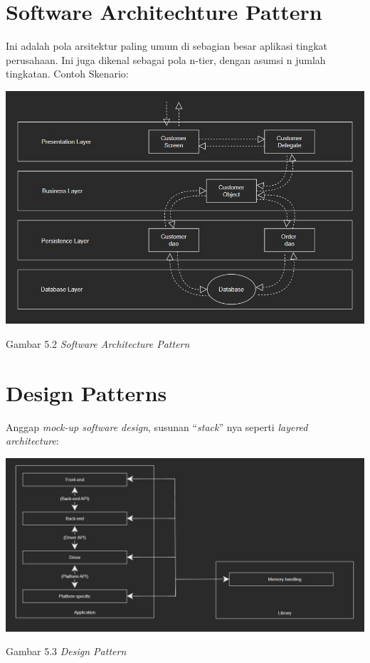 \section{Software Architechture Pattern}
Ini adalah pola arsitektur paling umum di sebagian besar aplikasi tingkat perusahaan. Ini juga dikenal sebagai pola n-tier, dengan asumsi n jumlah tingkatan. Contoh Skenario:

\includegraphics[width=\textwidth]{../images/Software Architecture Pattern}
\begin{center}
	Gambar 5.2 \textit{Software Architecture Pattern}
\end{center}


\section{Design Patterns}

Anggap \textit{mock-up software design}, susunan “\textit{stack}” nya seperti \textit{layered architecture}:

\includegraphics[width=\textwidth]{../images/Design Pattern}
\begin{center}
	Gambar 5.3 \textit{Design Pattern}
\end{center}

